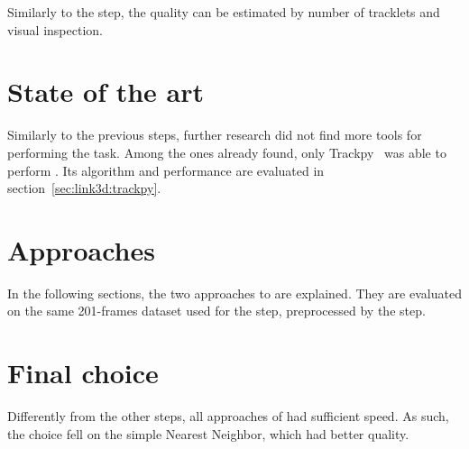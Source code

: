 Similarly to the \linkDD* step, the quality can be estimated by number of tracklets and visual inspection.

\section{State of the art}

Similarly to the previous steps, further research did not find more tools for performing the \linkDDD* task.
Among the ones already found, only Trackpy~\cite{trackpy} was able to perform \linkDDD*.
Its algorithm and performance are evaluated in section~\ref{sec:link3d:trackpy}.

\section{Approaches}

In the following sections, the two approaches to \linkDDD* are explained.
They are evaluated on the same 201-frames dataset used for the \linkDD* step, preprocessed by the \match* step.

\newpage
 \newpage
 \newpage

\section{Final choice}

Differently from the other steps, all approaches of \linkDDD* had sufficient speed.
As such, the choice fell on the simple Nearest Neighbor, which had better quality.
